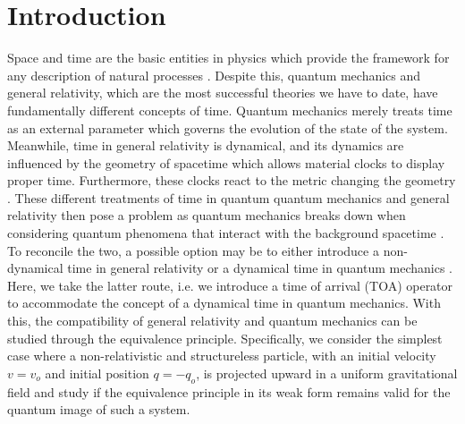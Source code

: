 \documentclass[%
 reprint,
 amsmath,amssymb,
 aps,
]{revtex4-1}
\begin{document}
\maketitle


\section{Introduction}
\label{sec:intro}

Space and time are the basic entities in physics which provide the framework for any description of natural processes \cite{toa2a,toa2b}. Despite this, quantum mechanics and general relativity, which are the most successful theories we have to date, have fundamentally different concepts of time. Quantum mechanics merely treats time as an external parameter which governs the evolution of the state of the system. Meanwhile, time in general relativity is dynamical, and its dynamics are influenced by the geometry of spacetime which allows material clocks to display proper time. Furthermore, these clocks react to the metric changing the geometry \cite{macias,zeh}. These different treatments of time in quantum quantum mechanics and general relativity then pose a problem as quantum mechanics breaks down when considering quantum phenomena that interact with the background spacetime \cite{macias}. To reconcile the two, a possible option may be to either introduce a non-dynamical time in general relativity or a dynamical time in quantum mechanics \cite{macias}. Here, we take the latter route, i.e. we introduce a time of arrival (TOA) operator to accommodate the concept of a dynamical time in quantum mechanics. With this, the compatibility of general relativity and quantum mechanics can be studied through the equivalence principle. Specifically, we consider the simplest case where a non-relativistic and structureless particle, with an initial velocity $v=v_o$ and initial position $q=-q_o$, is projected upward in a uniform gravitational field and study if the equivalence principle in its weak form remains valid for the quantum image of such a system.
\end{document}
